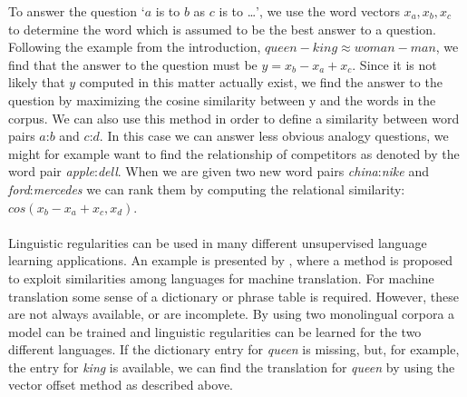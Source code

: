 \documentclass[11pt]{article}
\begin{document}
To answer the question `$a$ is to $b$ as $c$ is to \dots', we use the word vectors $x_a, x_b, x_c$ to determine the word which is assumed to be the best answer to a question. Following the example from the introduction, $\textit{queen} - \textit{king} \approx \textit{woman}  -\textit{man}$, we find that the answer to the question must be $y = x_b - x_a + x_c$. Since it is not likely that $y$ computed in this matter actually exist, we find the answer to the question by maximizing the cosine similarity between y and the words in the corpus. We can also use this method in order to define a similarity between word pairs $a$:$b$ and $c$:$d$. In this case we can answer less obvious analogy questions, we might for example want to find the relationship of competitors as denoted by the word pair \textit{apple}:\textit{dell}. When we are given two new word pairs \textit{china}:\textit{nike} and \textit{ford}:\textit{mercedes} we can rank them by computing the relational similarity: $cos(x_b - x_a + x_c, x_d)$.\\\\
Linguistic regularities can be used in many different unsupervised language learning applications. An example is presented by \cite{MikolovMT:13}, where a method is proposed to exploit similarities among languages for machine translation. For machine translation some sense of a dictionary or phrase table is required. However, these are not always available, or are incomplete. By using two monolingual corpora a model can be trained and linguistic regularities can be learned for the two different languages. If the dictionary entry for \textit{queen} is missing, but, for example, the entry for \textit{king} is available, we can find the translation for \textit{queen} by using the vector offset method as described above.
\end{document}
